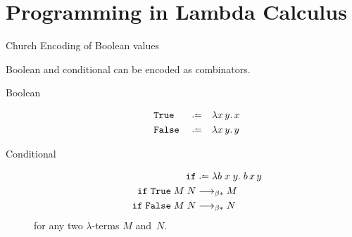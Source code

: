 \section{Programming in Lambda Calculus}
\begin{frame}{Church Encoding of Boolean values}
  
Boolean and conditional can be encoded as combinators.
  
\begin{description}
  \item[Boolean]
    \begin{align*}
      & \mathtt{True}  && \defeq && \lambda x\,y.\, x \\
      & \mathtt{False} && \defeq && \lambda x\,y.\, y
    \end{align*}

  \item[Conditional]
    \begin{align*}
      \mathtt{if} & \defeq \lambda b\;x\;y.\;b\,x\,y  \\
      \mathtt{if} \;\mathtt{True} \;M\;N &\reduce M \\
      \mathtt{if} \;\mathtt{False}\;M\;N &\reduce N
    \end{align*}
    for any two $\lambda$-terms $M$ and~$N$.
\end{description}

\end{frame}
